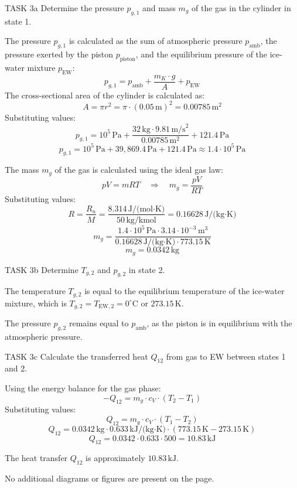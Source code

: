 TASK 3a  
Determine the pressure \( p_{g,1} \) and mass \( m_g \) of the gas in the cylinder in state 1.

The pressure \( p_{g,1} \) is calculated as the sum of atmospheric pressure \( p_{\text{amb}} \), the pressure exerted by the piston \( p_{\text{piston}} \), and the equilibrium pressure of the ice-water mixture \( p_{\text{EW}} \):  
\[
p_{g,1} = p_{\text{amb}} + \frac{m_K \cdot g}{A} + p_{\text{EW}}
\]  
The cross-sectional area of the cylinder is calculated as:  
\[
A = \pi r^2 = \pi \cdot (0.05 \, \text{m})^2 = 0.00785 \, \text{m}^2
\]  
Substituting values:  
\[
p_{g,1} = 10^5 \, \text{Pa} + \frac{32 \, \text{kg} \cdot 9.81 \, \text{m/s}^2}{0.00785 \, \text{m}^2} + 121.4 \, \text{Pa}
\]  
\[
p_{g,1} = 10^5 \, \text{Pa} + 39,869.4 \, \text{Pa} + 121.4 \, \text{Pa} \approx 1.4 \cdot 10^5 \, \text{Pa}
\]  

The mass \( m_g \) of the gas is calculated using the ideal gas law:  
\[
p V = m R T \quad \Rightarrow \quad m_g = \frac{p V}{R T}
\]  
Substituting values:  
\[
R = \frac{R_u}{M} = \frac{8.314 \, \text{J/(mol·K)}}{50 \, \text{kg/kmol}} = 0.16628 \, \text{J/(kg·K)}
\]  
\[
m_g = \frac{1.4 \cdot 10^5 \, \text{Pa} \cdot 3.14 \cdot 10^{-3} \, \text{m}^3}{0.16628 \, \text{J/(kg·K)} \cdot 773.15 \, \text{K}}
\]  
\[
m_g = 0.0342 \, \text{kg}
\]  

TASK 3b  
Determine \( T_{g,2} \) and \( p_{g,2} \) in state 2.  

The temperature \( T_{g,2} \) is equal to the equilibrium temperature of the ice-water mixture, which is \( T_{g,2} = T_{\text{EW},2} = 0^\circ\text{C} \) or \( 273.15 \, \text{K} \).  

The pressure \( p_{g,2} \) remains equal to \( p_{\text{amb}} \), as the piston is in equilibrium with the atmospheric pressure.  

TASK 3c  
Calculate the transferred heat \( Q_{12} \) from gas to EW between states 1 and 2.  

Using the energy balance for the gas phase:  
\[
-Q_{12} = m_g \cdot c_V \cdot (T_2 - T_1)
\]  
Substituting values:  
\[
Q_{12} = m_g \cdot c_V \cdot (T_1 - T_2)
\]  
\[
Q_{12} = 0.0342 \, \text{kg} \cdot 0.633 \, \text{kJ/(kg·K)} \cdot (773.15 \, \text{K} - 273.15 \, \text{K})
\]  
\[
Q_{12} = 0.0342 \cdot 0.633 \cdot 500 = 10.83 \, \text{kJ}
\]  

The heat transfer \( Q_{12} \) is approximately \( 10.83 \, \text{kJ} \).  

No additional diagrams or figures are present on the page.